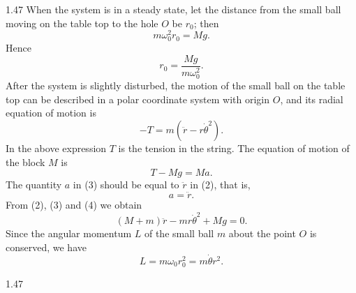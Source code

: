 \begin{solution}{1.47}
When the system is in a steady state, let the distance from the small ball moving on the table top to the hole $O$ be $r_0$; then
\[
m\omega_0^2r_0=Mg.
\]
Hence
\begin{equation}
r_0=\frac{Mg}{m\omega_0^2}. \tag{1}
\end{equation}
After the system is slightly disturbed, the motion of the small ball on the table top can be described in a polar coordinate system with origin $O$, and its radial equation of motion is
\begin{equation}
-T=m\left(\ddot{r}-r\dot{\theta}^2\right). \tag{2}
\end{equation}
In the above expression $T$ is the tension in the string. The equation of motion of the block $M$ is
\begin{equation}
T-Mg=Ma. \tag{3}
\end{equation}
The quantity $a$ in (3) should be equal to $\ddot{r}$ in (2), that is,
\begin{equation}
a=\ddot{r}. \tag{4}
\end{equation}
From (2), (3) and (4) we obtain
\begin{equation}
(M+m)\ddot{r}-mr\dot{\theta}^2+Mg=0. \tag{5}
\end{equation}
Since the angular momentum $L$ of the small ball $m$ about the point $O$ is conserved, we have
\[
L=m\omega_0r_0^2=m\dot{\theta}r^2.
\]

\begin{figbox}{1.47}
\end{figbox}


\end{solution}
